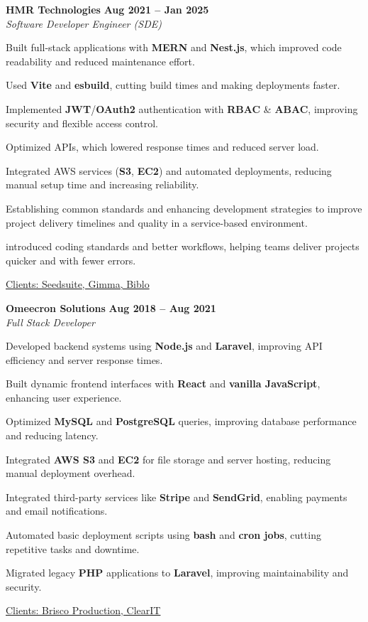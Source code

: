 \documentclass[letterpaper,10pt]{article}
\newcommand{\heading}[2]{
  \hspace{10pt}#1\hfill#2\\
}
\newcommand{\headingBf}[2]{
  \heading{\textbf{#1}}{\textbf{#2}}
}
\newcommand{\headingIt}[2]{
  \heading{\textit{#1}}{\textit{#2}}
}
\newenvironment{resume_list}{
  \vspace{-7pt}
  \begin{itemize}[itemsep=-2px, parsep=1pt, leftmargin=30pt]
}{
  \end{itemize}
}
\newcommand{\itemTitle}[1]{
  \item[] \underline{#1}\vspace{4pt}
}
\begin{document}
  \headingBf{ HMR Technologies }{Aug 2021 -- Jan 2025}
  \headingIt{Software Developer Engineer (SDE)}{}
  \begin{resume_list}
    \item Built full-stack applications with \textbf{MERN} and \textbf{Nest.js}, which improved code readability and reduced maintenance effort.
    \item Used \textbf{Vite} and \textbf{esbuild}, cutting build times and making deployments faster.
    \item Implemented \textbf{JWT}/\textbf{OAuth2} authentication with \textbf{RBAC} \& \textbf{ABAC}, improving security and flexible access control.
    \item Optimized APIs, which lowered response times and reduced server load.
    \item Integrated AWS services (\textbf{S3}, \textbf{EC2}) and automated deployments, reducing manual setup time and increasing reliability.
    \item Establishing common standards and enhancing development strategies to improve project delivery timelines and quality in a service-based environment.
    \item introduced coding standards and better workflows, helping teams deliver projects quicker and with fewer errors.
    \itemTitle{Clients: Seedsuite, Gimma, Biblo}
  \end{resume_list}


  \headingBf{ Omeecron Solutions }{Aug 2018 -- Aug 2021}
  \headingIt{Full Stack Developer}{}
  \begin{resume_list}
    \item Developed backend systems using \textbf{Node.js} and \textbf{Laravel}, improving API efficiency and server response times.
    \item Built dynamic frontend interfaces with \textbf{React} and \textbf{vanilla JavaScript}, enhancing user experience.
    \item Optimized \textbf{MySQL} and \textbf{PostgreSQL} queries, improving database performance and reducing latency.
    \item Integrated \textbf{AWS S3} and \textbf{EC2} for file storage and server hosting, reducing manual deployment overhead.
    \item Integrated third-party services like \textbf{Stripe} and \textbf{SendGrid}, enabling payments and email notifications.
    \item Automated basic deployment scripts using \textbf{bash} and \textbf{cron jobs}, cutting repetitive tasks and downtime.
    \item Migrated legacy \textbf{PHP} applications to \textbf{Laravel}, improving maintainability and security.
    \itemTitle{Clients: Brisco Production, ClearIT}
   \end{resume_list}
\end{document}
